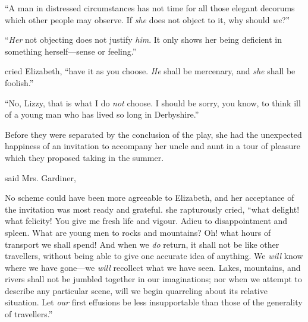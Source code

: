 
“A man in distressed circumstances has not time for all those elegant decorums which other people may observe. If {\em she} does not object to it, why should {\em we}?”

“{\em Her} not objecting does not justify {\em him}. It only shows her being deficient in something herself---sense or feeling.”

 cried Elizabeth, “have it as you choose. {\em He} shall be mercenary, and {\em she} shall be foolish.”

“No, Lizzy, that is what I do {\em not} choose. I should be sorry, you know, to think ill of a young man who has lived so long in Derbyshire.”



Before they were separated by the conclusion of the play, she had the unexpected happiness of an invitation to accompany her uncle and aunt in a tour of pleasure which they proposed taking in the summer.

 said Mrs. Gardiner, 

No scheme could have been more agreeable to Elizabeth, and her acceptance of the invitation was most ready and grateful.  she rapturously cried, “what delight! what felicity! You give me fresh life and vigour. Adieu to disappointment and spleen. What are young men to rocks and mountains? Oh! what hours of transport we shall spend! And when we {\em do} return, it shall not be like other travellers, without being able to give one accurate idea of anything. We {\em will} know where we have gone---we {\em will} recollect what we have seen. Lakes, mountains, and rivers shall not be jumbled together in our imaginations; nor when we attempt to describe any particular scene, will we begin quarreling about its relative situation. Let {\em our} first effusions be less insupportable than those of the generality of travellers.”

